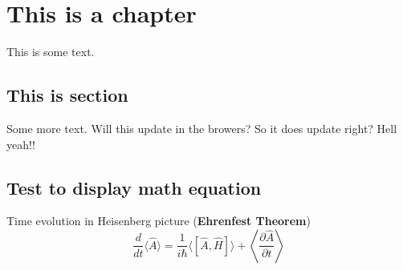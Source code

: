 \documentclass[a4paper,10pt]{book}
\begin{document}
\chapter{This is a chapter}
This is some text.
\section{This is section}
Some more text. Will this update in the browers?
So it does update right? Hell yeah!!
\section{Test to display math equation}
Time evolution in Heisenberg picture (\textbf{Ehrenfest Theorem})
\[
    \frac{d}{dt}\langle \hat{A} \rangle = \frac{1}{i\hbar}\langle [\hat{A}, \hat{H}] \rangle + \left\langle \frac{\partial \hat{A}}{\partial t} \right\rangle
\]
\end{document}
